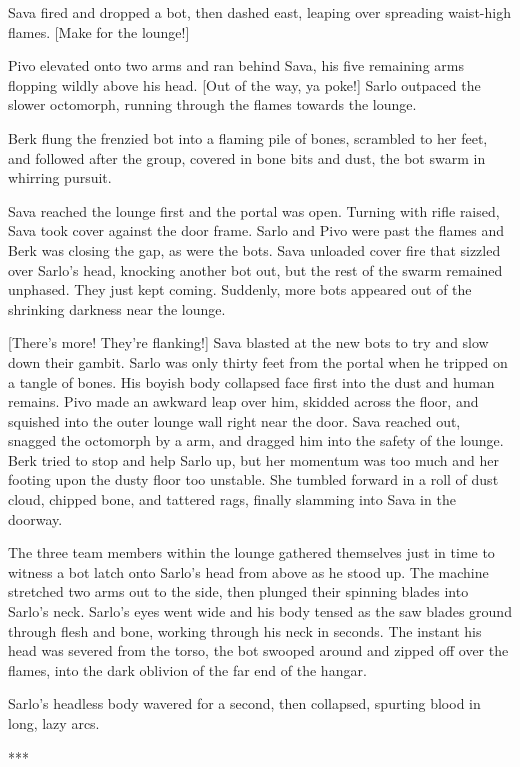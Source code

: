 Sava fired and dropped a bot, then dashed east, leaping over spreading
waist-high flames. [Make for the lounge!]

Pivo elevated onto two arms and ran behind Sava, his five remaining
arms flopping wildly above his head. [Out of the way, ya poke!] Sarlo
outpaced the slower octomorph, running through the flames towards the
lounge.

Berk flung the frenzied bot into a flaming pile of bones, scrambled to
her feet, and followed after the group, covered in bone bits and dust,
the bot swarm in whirring pursuit.

Sava reached the lounge first and the portal was open.  Turning with
rifle raised, Sava took cover against the door frame. Sarlo and Pivo
were past the flames and Berk was closing the gap, as were the
bots. Sava unloaded cover fire that sizzled over Sarlo's head,
knocking another bot out, but the rest of the swarm remained
unphased. They just kept coming. Suddenly, more bots appeared out of
the shrinking darkness near the lounge.

[There's more! They're flanking!] Sava blasted at the new bots to try
and slow down their gambit. Sarlo was only thirty feet from the portal
when he tripped on a tangle of bones. His boyish body collapsed face
first into the dust and human remains. Pivo made an awkward leap over
him, skidded across the floor, and squished into the outer lounge wall
right near the door. Sava reached out, snagged the octomorph by a arm,
and dragged him into the safety of the lounge.  Berk tried to stop and
help Sarlo up, but her momentum was too much and her footing upon the
dusty floor too unstable. She tumbled forward in a roll of dust cloud,
chipped bone, and tattered rags, finally slamming into Sava in the
doorway.

The three team members within the lounge gathered themselves just in
time to witness a bot latch onto Sarlo's head from above as he stood
up. The machine stretched two arms out to the side, then plunged their
spinning blades into Sarlo's neck. Sarlo's eyes went wide and his body
tensed as the saw blades ground through flesh and bone, working
through his neck in seconds.  The instant his head was severed from
the torso, the bot swooped around and zipped off over the flames, into
the dark oblivion of the far end of the hangar.

Sarlo's headless body wavered for a second, then collapsed, spurting
blood in long, lazy arcs.

\begin{center}
  ***
\end{center}


